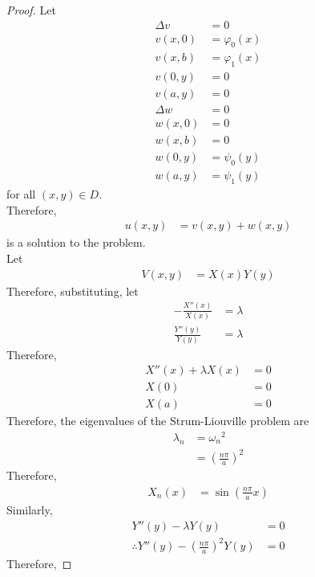 \documentclass[titlepage, fleqn, a4paper, 12pt, twoside]{article}
\theoremstyle{definition}
\theoremstyle{theorem}
\begin{document}
\begin{proof}
	Let
	\begin{align*}
		\Delta v & = 0            \\
		v(x,0)   & = \varphi_0(x) \\
		v(x,b)   & = \varphi_1(x) \\
		v(0,y)   & = 0            \\
		v(a,y)   & = 0            \\
		\Delta w & = 0            \\
		w(x,0)   & = 0            \\
		w(x,b)   & = 0            \\
		w(0,y)   & = \psi_0(y)    \\
		w(a,y)   & = \psi_1(y)
	\end{align*}
	for all $(x,y) \in D$.\\
	Therefore,
	\begin{align*}
		u(x,y) & = v(x,y) + w(x,y)
	\end{align*}
	is a solution to the problem.\\
	Let
	\begin{align*}
		V(x,y) & = X(x) Y(y)
	\end{align*}
	Therefore, substituting, let
	\begin{align*}
		-\frac{X''(x)}{X(x)} & = \lambda \\
		\frac{Y''(y)}{Y(y)}  & = \lambda
	\end{align*}
	Therefore,
	\begin{align*}
		X''(x) + \lambda X(x) & = 0 \\
		X(0)                  & = 0 \\
		X(a)                  & = 0
	\end{align*}
	Therefore, the eigenvalues of the Strum-Liouville problem are
	\begin{align*}
		\lambda_n & = {\omega_n}^2 \\
                          & = \left( \frac{n \pi}{a} \right)^2
	\end{align*}
	Therefore,
	\begin{align*}
		X_n(x) & = \sin\left( \frac{n \pi}{a} x \right)
	\end{align*}
	Similarly,
	\begin{align*}
		Y''(y) - \lambda Y(y)                                     & = 0 \\
		\therefore Y''(y) - \left( \frac{n \pi}{a} \right)^2 Y(y) & = 0
	\end{align*}
	Therefore,

\end{proof}
\end{document}
